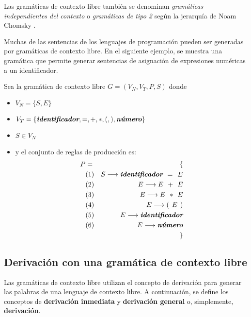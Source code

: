  Las gramáticas de contexto libre también se denominan \textit{gramáticas independientes del contexto} o \textit{gramáticas de tipo 2} según la jerarquía de Noam Chomsky \cite{aho2008}.

 Muchas de las sentencias de los lenguajes de programación pueden ser generadas por gramáticas de contexto libre. En el siguiente ejemplo, se muestra una gramática que permite generar sentencias de asignación de expresiones numéricas a un identificador.
 
Sea la gramática de contexto libre $G = (V_N, V_T,P,S)$ donde
\begin{itemize}
\item $V_N = \{S, E\}$
\item $V_T = \{\mbox{\bf\em identificador}, =, +, *, (, ), \mbox{\bf\em número}\}$
\item $S \in V_N$
\item y el conjunto de reglas de producción es:
\begin{eqnarray*}
  P & = & \{ \\
     & (1) & S \longrightarrow \mbox{\bf\em identificador } = \hspace{1ex} E \\
     & (2) & E \longrightarrow E \hspace{1ex} + \hspace{1ex} E \\
     & (3) & E \longrightarrow E \hspace{1ex} * \hspace{1ex} E \\
     & (4) & E \longrightarrow ( \hspace{1ex} E \hspace{1ex} ) \\
     & (5) & E \longrightarrow \mbox{\bf\em identificador} \\
     & (6) & E \longrightarrow \mbox{\bf\em número} \\ 
     &   &\}
\end{eqnarray*}
\end{itemize}


\subsection{Derivación con una gramática de contexto libre}
 
 Las gramáticas de contexto libre utilizan el concepto de derivación para generar las palabras de una lenguaje de contexto libre. A continuación, se define los conceptos de \textbf{derivación inmediata} y \textbf{derivación general} o, simplemente, \textbf{derivación}.

